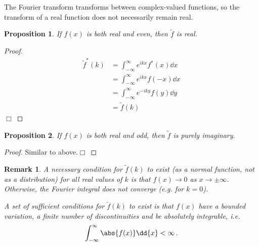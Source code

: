 \documentclass{article}
\theoremstyle{plain}\theoremheaderfont{\normalfont\itshape}\theorembodyfont{\rmfamily}\theoremseparator{.}\newtheorem*{rem}{Remark}\newtheorem*{ex}{Example}\newtheorem*{proof}{Proof}\newtheorem*{altp}{Alternative proof}
\theoremstyle{plain}\theoremheaderfont{\normalfont\bfseries}\theorembodyfont{\rmfamily}\theoremseparator{.}\newtheorem{thm}{Theorem}[section]\newtheorem{lem}[thm]{Lemma}\newtheorem{prop}[thm]{Proposition}\newtheorem*{cor}{Corollary}\newtheorem{defn}[thm]{Definition}\newtheorem{clm}[thm]{Claim}\newtheorem{clminproof}{Claim}
\theoremstyle{break}\theoremheaderfont{\normalfont\itshape}\theorembodyfont{\rmfamily}\theoremseparator{.\medskip}\newtheorem*{proofskip}{Proof}\newtheorem*{exs}{Examples}\newtheorem*{rems}{Remarks}
\theoremstyle{break}\theoremheaderfont{\normalfont\bfseries}\theorembodyfont{\rmfamily}\theoremseparator{.\medskip}\newtheorem{lemskip}[thm]{Lemma}\newtheorem{defnskip}[thm]{Definition}\newtheorem{propskip}[thm]{Proposition}\newtheorem{thmskip}[thm]{Theorem}
\numberwithin{equation}{section}
\newcommand{\qed}{\hfill\ensuremath{\Box}}
\begin{document}
	The Fourier transform transforms between complex-valued functions, so the transform of a real function does not necessarily remain real.
	\begin{prop}
		If \(f(x)\) is both real and even, then \(\tilde{f}\) is real.
	\end{prop}
	\begin{proof}
		\begin{align*}
			\tilde{f}^*(k)&=\int_{-\infty}^{\infty}e^{ikx}f^*(x)\dd{x}\\
			&=\int_{-\infty}^{\infty}e^{ikx}f(-x)\dd{x}\\
			&=\int_{-\infty}^{\infty}e^{-iky}f(y)\dd{y}\\
			&=\tilde{f}(k)
		\end{align*}\qed
	\end{proof}
	\begin{prop}
		If \(f(x)\) is both real and odd, then \(\tilde{f}\) is purely imaginary.
	\end{prop}
	\begin{proof}
		Similar to above.\qed
	\end{proof}
	\begin{rem}
		A necessary condition for \(\tilde{f}(k)\) to exist (as a normal function, not as a distribution) for all real values of \(k\) is that \(f(x)\to 0\) as \(x\to\pm\infty\). Otherwise, the Fourier integral does not converge (e.g. for \(k=0\)).
	
		A set of sufficient conditions for \(\tilde{f}(k)\) to exist is that \(f(x)\) have a bounded variation, a finite number of discontinuities and be absolutely integrable, i.e.
		\[\int_{-\infty}^{\infty}\abs{f(x)}\dd{x}<\infty\,.\]
	\end{rem}
	
\end{document}
